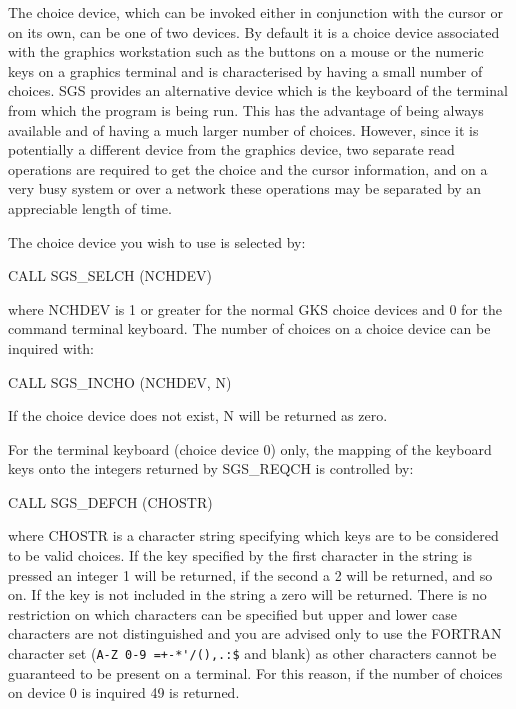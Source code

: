 \documentclass[11pt]{starlink}
\begin{document}
The choice device, which can be invoked either in conjunction with the cursor
or on its own, can be one of two devices.  By
default it is a choice device
associated with the graphics workstation such as the  buttons on
a mouse or the numeric keys on a graphics terminal and is characterised by
having a small number of choices.  SGS provides an
alternative device which is the keyboard of the terminal from which the
program is being run.  This
has the advantage of being always available
and of having a much larger number of
choices.  However, since
it is potentially a different device from the graphics device, two separate
read operations are required to get the choice and the cursor
information,
and
on a very busy system or over a network these operations may be separated by
an appreciable length of time.

The choice device you wish to use is selected by:
\begin{terminalv}
CALL SGS_SELCH (NCHDEV)
\end{terminalv}
where NCHDEV is 1 or greater for the normal GKS choice devices and 0 for the
command terminal keyboard.
The number of choices on a choice device can be inquired with:
\begin{terminalv}
CALL SGS_INCHO (NCHDEV, N)
\end{terminalv}
If the choice device does not exist, N will be returned as zero.

For the terminal keyboard (choice device
0) only, the mapping of the keyboard keys onto the integers returned by
SGS\_REQCH is controlled by:
\begin{terminalv}
CALL SGS_DEFCH (CHOSTR)
\end{terminalv}
where CHOSTR is a character string specifying which keys are to be considered
to be valid choices.  If the key specified by the first character in
the string is pressed an
integer 1 will be
returned, if the second a 2 will be returned,
and so on.  If the key is not included in the string
a zero will be returned.  There is no restriction on which characters can be
specified but upper and lower case characters are not distinguished and you
are advised only to use the FORTRAN character set (\verb#A-Z 0-9 =+-*'/(),.:$#
and blank) as other characters cannot be guaranteed to be present on a
terminal.  For this reason, if
the number of choices on device 0 is inquired 49 is
returned.
\end{document}
